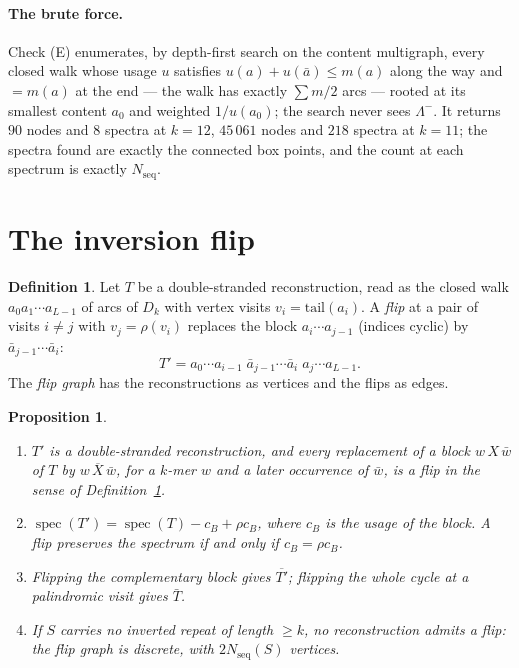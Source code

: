 \documentclass[11pt]{article}
\theoremstyle{plain}
\newtheorem{proposition}[theorem]{Proposition}
\theoremstyle{definition}
\newtheorem{definition}[theorem]{Definition}
\theoremstyle{remark}
\newcommand{\spec}{\operatorname{spec}}
\newcommand{\Nseq}{N_{\mathrm{seq}}}
\newcommand{\Lm}{\Lambda^{-}}
\begin{document}
\paragraph{The brute force.}
Check (E) enumerates, by depth-first search on the content multigraph, every closed walk
whose usage $u$ satisfies $u(a)+u(\bar a)\le m(a)$ along the way and $=m(a)$ at the end ---
the walk has exactly $\sum m/2$ arcs --- rooted at its smallest content $a_0$ and weighted
$1/u(a_0)$; the search never sees $\Lm$. It returns $90$ nodes and $8$ spectra at $k=12$,
$45\,061$ nodes and $218$ spectra at $k=11$; the spectra found are exactly the connected box
points, and the count at each spectrum is exactly $\Nseq$.

\section{The inversion flip}

\begin{definition}\label{def:flip}
Let $T$ be a double-stranded reconstruction, read as the closed walk $a_0a_1\cdots a_{L-1}$
of arcs of $D_k$ with vertex visits $v_i=\mathrm{tail}(a_i)$. A \emph{flip} at a pair of
visits $i\neq j$ with $v_j=\rho(v_i)$ replaces the block $a_i\cdots a_{j-1}$ (indices cyclic)
by $\bar a_{j-1}\cdots\bar a_i$:
\[
  T'=a_0\cdots a_{i-1}\;\bar a_{j-1}\cdots\bar a_{i}\;a_j\cdots a_{L-1}.
\]
The \emph{flip graph} has the reconstructions as vertices and the flips as edges.
\end{definition}

\begin{proposition}\label{prop:flip}
\begin{enumerate}
\item[\rm(a)] $T'$ is a double-stranded reconstruction, and every replacement of a block
$w\,X\,\bar w$ of $T$ by $w\,\overline X\,\bar w$, for a $k$-mer $w$ and a later occurrence of
$\bar w$, is a flip in the sense of Definition~\ref{def:flip}.
\item[\rm(b)] $\spec(T')=\spec(T)-c_B+\rho c_B$, where $c_B$ is the usage of the block. A flip
preserves the spectrum if and only if $c_B=\rho c_B$.
\item[\rm(c)] Flipping the complementary block gives $\overline{T'}$; flipping the whole
cycle at a palindromic visit gives $\bar T$.
\item[\rm(d)] If $S$ carries no inverted repeat of length $\ge k$, no reconstruction admits a
flip: the flip graph is discrete, with $2\Nseq(S)$ vertices.
\end{enumerate}
\end{proposition}
\end{document}
